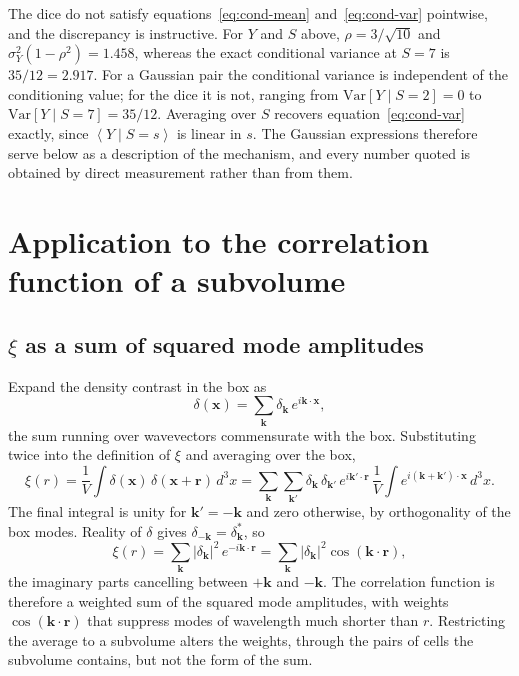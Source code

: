 \documentclass[12pt]{article}
\newcommand{\bk}{\mathbf{k}}
\newcommand{\bx}{\mathbf{x}}
\newcommand{\br}{\mathbf{r}}
\newcommand{\avg}[1]{\left\langle #1 \right\rangle}
\newcommand{\Var}{\mathrm{Var}}
\begin{document}
The dice do not satisfy equations~\eqref{eq:cond-mean}
and~\eqref{eq:cond-var} pointwise, and the discrepancy is instructive.  For $Y$
and $S$ above, $\rho = 3/\sqrt{10}$ and $\sigma_Y^{2}(1 - \rho^{2}) = 1.458$,
whereas the exact conditional variance at $S = 7$ is $35/12 = 2.917$.  For a
Gaussian pair the conditional variance is independent of the conditioning
value; for the dice it is not, ranging from $\Var[Y \mid S = 2] = 0$ to
$\Var[Y \mid S = 7] = 35/12$.  Averaging over $S$ recovers
equation~\eqref{eq:cond-var} exactly, since $\avg{Y \mid S = s}$ is linear in
$s$.  The Gaussian expressions therefore serve below as a description of the
mechanism, and every number quoted is obtained by direct measurement rather
than from them.

\section{Application to the correlation function of a subvolume}
\label{sec:application}

\subsection{$\xi$ as a sum of squared mode amplitudes}\label{sec:xi-sum}

Expand the density contrast in the box as
\begin{equation}
  \delta(\bx) = \sum_{\bk} \delta_{\bk}\, e^{i \bk \cdot \bx},
\end{equation}
the sum running over wavevectors commensurate with the box.  Substituting twice
into the definition of $\xi$ and averaging over the box,
\begin{equation}
  \xi(r) = \frac{1}{V}\int \delta(\bx)\,\delta(\bx + \br)\, d^3x
         = \sum_{\bk}\sum_{\bk'} \delta_{\bk}\,\delta_{\bk'}\,
           e^{i \bk' \cdot \br}\,
           \frac{1}{V}\int e^{i(\bk + \bk')\cdot \bx}\, d^3x .
\end{equation}
The final integral is unity for $\bk' = -\bk$ and zero otherwise, by
orthogonality of the box modes.  Reality of $\delta$ gives $\delta_{-\bk} =
\delta_{\bk}^{*}$, so
\begin{equation}
  \xi(r) = \sum_{\bk} |\delta_{\bk}|^{2}\, e^{-i \bk \cdot \br}
         = \sum_{\bk} |\delta_{\bk}|^{2} \cos(\bk \cdot \br),
  \label{eq:xi-sum}
\end{equation}
the imaginary parts cancelling between $+\bk$ and $-\bk$.  The correlation
function is therefore a weighted sum of the squared mode amplitudes, with
weights $\cos(\bk\cdot\br)$ that suppress modes of wavelength much shorter than
$r$.  Restricting the average to a subvolume alters the weights, through the
pairs of cells the subvolume contains, but not the form of the sum.
\end{document}
